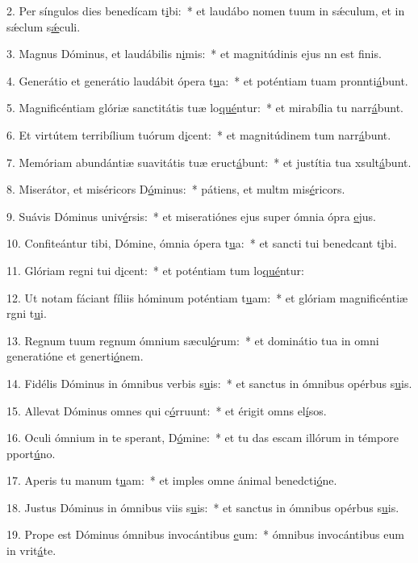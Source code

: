 2. Per síngulos dies benedícam t\uline{i}bi:~* et laudábo nomen tuum in sǽculum, et in sǽclum s\uline{ǽ}culi.\par 
3. Magnus Dóminus, et laudábilis n\uline{i}mis:~* et magnitúdinis ejus nn est f\uline{i}nis.\par 
4. Generátio et generátio laudábit ópera t\uline{u}a:~* et poténtiam tuam pronnti\uline{á}bunt.\par 
5. Magnificéntiam glóriæ sanctitátis tuæ lo\uline{qué}ntur:~* et mirabília tu narr\uline{á}bunt.\par 
6. Et virtútem terribílium tuórum d\uline{i}cent:~* et magnitúdinem tum narr\uline{á}bunt.\par 
7. Memóriam abundántiæ suavitátis tuæ eruct\uline{á}bunt:~* et justítia tua xsult\uline{á}bunt.\par 
8. Miserátor, et miséricors D\uline{ó}minus:~* pátiens, et multm mis\uline{é}ricors.\par 
9. Suávis Dóminus univ\uline{é}rsis:~* et miseratiónes ejus super ómnia ópra \uline{e}jus.\par 
10. Confiteántur tibi, Dómine, ómnia ópera t\uline{u}a:~* et sancti tui benedcant t\uline{i}bi.\par 
11. Glóriam regni tui d\uline{i}cent:~* et poténtiam tum lo\uline{qué}ntur:\par 
12. Ut notam fáciant fíliis hóminum poténtiam t\uline{u}am:~* et glóriam magnificéntiæ rgni t\uline{u}i.\par 
13. Regnum tuum regnum ómnium sæcul\uline{ó}rum:~* et dominátio tua in omni generatióne et generti\uline{ó}nem.\par 
14. Fidélis Dóminus in ómnibus verbis s\uline{u}is:~* et sanctus in ómnibus opérbus s\uline{u}is.\par 
15. Allevat Dóminus omnes qui c\uline{ó}rruunt:~* et érigit omns el\uline{í}sos.\par 
16. Oculi ómnium in te sperant, D\uline{ó}mine:~* et tu das escam illórum in témpore pport\uline{ú}no.\par 
17. Aperis tu manum t\uline{u}am:~* et imples omne ánimal benedcti\uline{ó}ne.\par 
18. Justus Dóminus in ómnibus viis s\uline{u}is:~* et sanctus in ómnibus opérbus s\uline{u}is.\par 
19. Prope est Dóminus ómnibus invocántibus \uline{e}um:~* ómnibus invocántibus eum in vrit\uline{á}te.\par 
